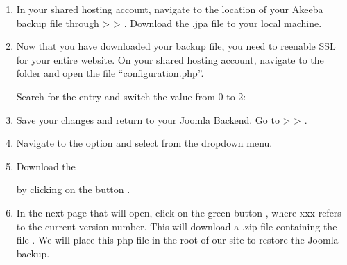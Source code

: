 \documentclass[a4paper,10pt,english,openany,oneside]{sphinxmanual}
\begin{document}
\begin{sloppypar}
\begin{enumerate}
\item {} 
\sphinxAtStartPar
In your shared hosting account, navigate to the location of your Akeeba backup file through  >  > . Download the .jpa file to your local machine.

\item {} 
\sphinxAtStartPar
Now that you have downloaded your backup file, you need to re\sphinxhyphen{}enable SSL for your entire website. On your shared hosting account, navigate to the folder  and open the file “configuration.php”.

\sphinxAtStartPar
Search for the entry  and switch the value from 0 to 2:
\begin{quote}

\begin{sphinxVerbatim}[commandchars=\\\{\}]
\end{sphinxVerbatim}
\end{quote}

\item {} 
\sphinxAtStartPar
Save your changes and return to your Joomla Backend. Go to  >  > .

\item {} 
\sphinxAtStartPar
Navigate to the option  and select  from the drop\sphinxhyphen{}down menu.

\item {} 
\sphinxAtStartPar
Download the %
\begin{footnote}[8]\sphinxAtStartFootnote
{}
%
\end{footnote} by clicking on the button .

\item {} 
\sphinxAtStartPar
In the next page that will open, click on the green button , where xxx refers to the current version number. This will download a .zip file containing the file . We will place this php file in the root of our site to restore the Joomla backup.


\end{enumerate}
\end{sloppypar}
\end{document}
